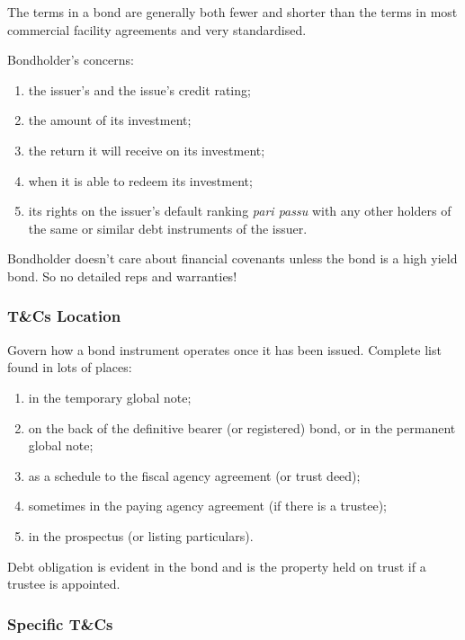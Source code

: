 \documentclass[
]{article}
\providecommand{\tightlist}{%
  \setlength{\itemsep}{0pt}\setlength{\parskip}{0pt}}
\begin{document}
The terms in a bond are generally both fewer and shorter than the terms
in most commercial facility agreements and very standardised.

Bondholder's concerns:

\begin{enumerate}
\def\labelenumi{\arabic{enumi}.}
\tightlist
\item
  the issuer's and the issue's credit rating;
\item
  the amount of its investment;
\item
  the return it will receive on its investment;
\item
  when it is able to redeem its investment;
\item
  its rights on the issuer's default ranking \emph{pari passu} with any
  other holders of the same or similar debt instruments of the issuer.
\end{enumerate}

Bondholder doesn't care about financial covenants unless the bond is a
high yield bond. So no detailed reps and warranties!

\hypertarget{tcs-location}{%
\subsubsection{T\&Cs Location}\label{tcs-location}}

Govern how a bond instrument operates once it has been issued. Complete
list found in lots of places:

\begin{enumerate}
\def\labelenumi{\arabic{enumi}.}
\tightlist
\item
  in the temporary global note;
\item
  on the back of the definitive bearer (or registered) bond, or in the
  permanent global note;
\item
  as a schedule to the fiscal agency agreement (or trust deed);
\item
  sometimes in the paying agency agreement (if there is a trustee);
\item
  in the prospectus (or listing particulars).
\end{enumerate}

Debt obligation is evident in the bond and is the property held on trust
if a trustee is appointed.

\hypertarget{specific-tcs}{%
\subsubsection{Specific T\&Cs}\label{specific-tcs}}
\end{document}

